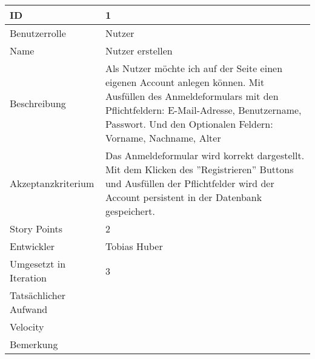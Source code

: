 \begin{tabularx}{\textwidth}{|p{}|X|}
		\hline 
		ID & 1 \\ 
		\hline 
		Benutzerrolle & Nutzer \\ 
		\hline 
		Name & Nutzer erstellen \\ 
		\hline 
		Beschreibung & Als Nutzer möchte ich auf der Seite einen eigenen Account anlegen können. Mit Ausfüllen des Anmeldeformulars mit den Pflichtfeldern:
		E-Mail-Adresse,
		Benutzername,
		Passwort.
		Und den Optionalen Feldern:
		Vorname,
		Nachname,
		Alter \\ 
		\hline 
		Akzeptanzkriterium & Das Anmeldeformular wird korrekt dargestellt. Mit dem Klicken des ''Registrieren'' Buttons und Ausfüllen der Pflichtfelder wird der Account persistent in der Datenbank gespeichert. \\ 
		\hline 
		Story Points & 2 \\ 
		\hline 
		Entwickler & Tobias Huber \\ 
		\hline 
		Umgesetzt in Iteration & 3 \\ 
		\hline 
		Tatsächlicher Aufwand &  \\ 
		\hline 
		Velocity &  \\ 
		\hline  
		Bemerkung &  \\ 
		\hline
\end{tabularx} 
\vspace{20pt}
